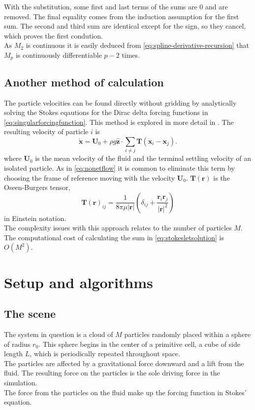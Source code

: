 \documentclass[a4paper,
twoside=false,abstract=false,numbers=noenddot,
titlepage=false,headings=small,parskip=half,version=last]{scrartcl}
\begin{document}
With the substitution, some first and last terms of the sums are 0 and are removed.
The final equality comes from the induction assumption for the first sum.
The second and third sum are identical except for the sign, so they cancel, which proves the first condution.\\
As $M_2$ is continuous it is easily deduced from \eqref{eq:spline-derivative-recursion} that $M_p$ is continuously differentiable $p-2$ times.

\subsection{Another method of calculation}
The particle velocities can be found directly without gridding by analytically solving the Stokes eqautions for the Dirac delta forcing functions in \eqref{eq:singularforcingfunction}. This method is explored in more detail in \cite{fallingclouds}.
The resulting velocity of particle $i$ is
\begin{equation}
\dot{\mathbf{x}} = \mathbf{U}_0 + \rho g\hat{\mathbf{z}} \cdot \sum_{i\neq j} \mathbf{T}(\mathbf{x}_i-\mathbf{x}_j).\label{eq:stokesletsolution}
\end{equation}
where $\mathbf{U}_0$ is the mean velocity of the fluid and the terminal settling velocity of an isolated particle.
As in \eqref{eq:nonetflow} it is common to eliminate this term by choosing the frame of reference moving with the velocity $\mathbf{U}_0$. $\mathbf{T}(\mathbf{r})$ is the Oseen-Burgers tensor,
\begin{equation}
\mathbf{T}(\mathbf{r})_{ij} = \frac{1}{8\pi \mu |\mathbf{r}|} \left( \delta_{ij} + \frac{\mathbf{r}_i \mathbf{r}_j}{|\mathbf{r}|^2}\right)\nonumber
\end{equation}
in Einstein notation.\\
The complexity issues with this approach relates to the number of particles $M$. The computational cost of calculating the sum in \eqref{eq:stokesletsolution} is $O(M^2)$.

\section{Setup and algorithms}

\subsection{The scene}
The system in question is a cloud of $M$ particles randomly placed within a sphere of radius $r_0$. This sphere begins in the center of a primitive cell, a cube of side length $L$, which is periodically repeated throughout space.\\
The particles are affected by a gravitational force downward and a lift from the fluid. The resulting force on the particles is the sole driving force in the simulation.\\
The force from the particles on the fluid make up the forcing function in Stokes' equation.
\end{document}
